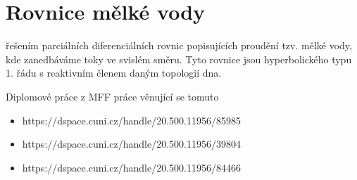 \section{Rovnice mělké vody}

řešením parciálních diferenciálních rovnic popisujících proudění tzv. mělké vody, kde zanedbáváme toky ve svislém směru. Tyto rovnice jsou hyperbolického typu 1. řádu s reaktivním členem daným topologií dna.

Diplomové práce z MFF práce věnující se tomuto 

\begin{itemize}
    \item https://dspace.cuni.cz/handle/20.500.11956/85985
    \item https://dspace.cuni.cz/handle/20.500.11956/39804
    \item https://dspace.cuni.cz/handle/20.500.11956/84466
\end{itemize}